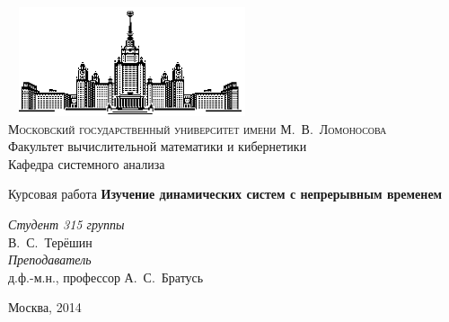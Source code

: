 \documentclass[11pt]{article}
\begin{document}
\thispagestyle{empty}

\begin{center}
\ \vspace{-3cm} \newline
\includegraphics[width=0.5\textwidth]{msu.eps}\\
{\scshape Московский государственный университет имени М.~В.~Ломоносова}\\
Факультет вычислительной математики и кибернетики\\
Кафедра системного анализа

\vfill

{\LARGE Курсовая работа} \newline
{\Huge\bfseries Изучение динамических систем с непрерывным временем}
\end{center}

\vspace{1cm}
\begin{flushright}
\large
\textit{Студент 315 группы}\\
В.~С.~Терёшин\\
\vspace{5mm}
\textit{Преподаватель}\\
д.ф.-м.н., профессор А.~С.~Братусь
\end{flushright}

\vfill
\begin{center}
Москва, 2014
\end{center}
\pagebreak
\tableofcontents
\pagebreak
\end{document}
